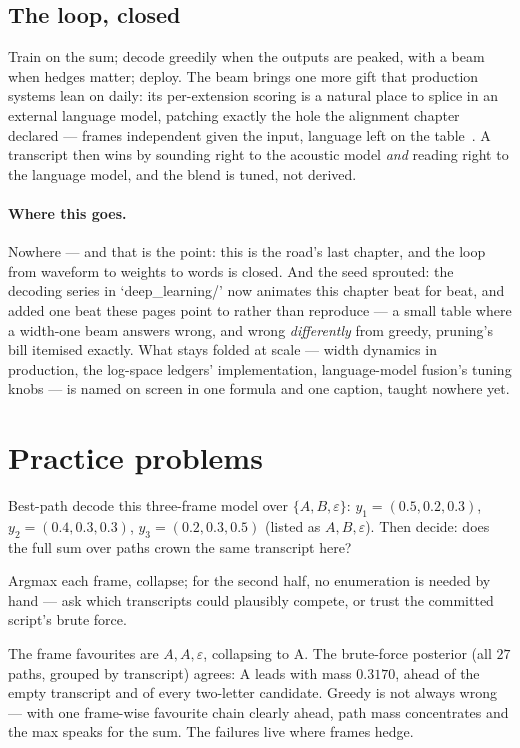 \begin{narrative}
\section{The loop, closed}

Train on the sum; decode greedily when the outputs are peaked, with a
beam when hedges matter; deploy. The beam brings one more gift that
production systems lean on daily: its per-extension scoring is a
natural place to splice in an external language model, patching
exactly the hole the alignment chapter declared — frames independent
given the input, language left on the
table~\cite{probability-awni-hannun-et-al-deep-speech-scaling-up-end-to-end-speech-r}.
A transcript then wins by sounding right to the acoustic model
\emph{and} reading right to the language model, and the blend is
tuned, not derived.

\paragraph{Where this goes.} Nowhere — and that is the point: this is
the road's last chapter, and the loop from waveform to weights to
words is closed. And the seed sprouted: the decoding series in
`deep\_learning/' now animates this chapter beat for beat, and added
one beat these pages point to rather than reproduce — a small table
where a width-one beam answers wrong, and wrong \emph{differently}
from greedy, pruning's bill itemised exactly. What stays folded at
scale — width dynamics in production, the log-space ledgers'
implementation, language-model fusion's tuning knobs — is named on
screen in one formula and one caption, taught nowhere yet.
\end{narrative}

\section*{Practice problems}

\begin{problem}
Best-path decode this three-frame model over $\{A, B, \varepsilon\}$:
$y_1 = (0.5, 0.2, 0.3)$, $y_2 = (0.4, 0.3, 0.3)$,
$y_3 = (0.2, 0.3, 0.5)$ (listed as $A, B, \varepsilon$). Then decide:
does the full sum over paths crown the same transcript here?
\begin{hint}
Argmax each frame, collapse; for the second half, no enumeration is
needed by hand — ask which transcripts could plausibly compete, or
trust the committed script's brute force.
\end{hint}
\begin{solution}
The frame favourites are $A, A, \varepsilon$, collapsing to A. The
brute-force posterior (all $27$ paths, grouped by transcript) agrees:
A leads with mass $0.3170$, ahead of the empty transcript and of
every two-letter candidate. Greedy is not always wrong — with one
frame-wise favourite chain clearly ahead, path mass concentrates and
the max speaks for the sum. The failures live where frames hedge.
\end{solution}
\end{problem}

